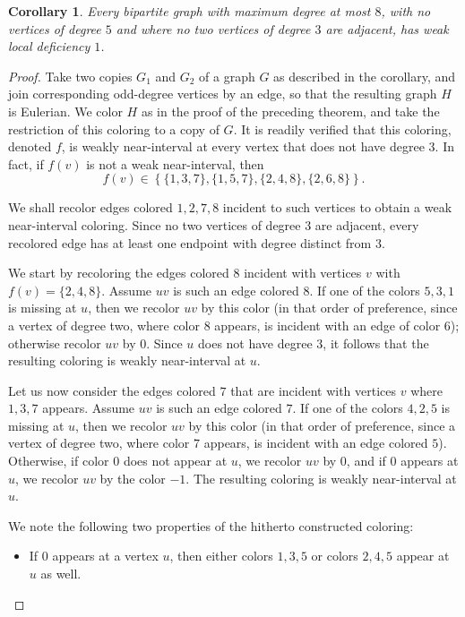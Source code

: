\documentclass[12pt]{article}
\theoremstyle{plain}
\newtheorem{corollary}[theorem]{Corollary}
\theoremstyle{definition}
\numberwithin{equation}{section}
\begin{document}
\begin{corollary}
	Every  bipartite graph with maximum degree at most $8$, with no vertices of degree $5$ and
	where no two vertices of degree $3$ are adjacent, has weak local deficiency $1$.
\end{corollary}
\begin{proof}
	Take two copies $G_1$ and $G_2$ of a graph $G$ as described in the corollary, 
	and join corresponding odd-degree 
	vertices by an edge, so that the resulting graph $H$ is Eulerian. We color $H$
	as in the proof of the preceding
	theorem, and take the restriction of this coloring to a copy of $G$. It is readily verified that this coloring,
	denoted $f$, is weakly near-interval at every vertex that does not have degree $3$.
	In fact, if $f(v)$ is not a weak near-interval, then
	$$f(v) \in \left\{ \{1,3,7\}, \{1,5,7\}, \{2,4,8\}, \{2,6,8\}  \right\}.$$

	We shall recolor edges colored $1,2,7,8$ incident to such vertices to obtain a weak near-interval
	coloring.  Since no two vertices of degree $3$ are adjacent, every recolored
	edge has at least one endpoint with degree distinct from $3$.

	We start by recoloring the edges colored $8$ incident with vertices $v$ with $f(v)=\{2,4,8\}$.
	Assume $uv$ is such an edge colored $8$. If one of the colors $5,3,1$ is missing at $u$,
	then we recolor $uv$ by this color (in that order of preference, since a vertex of degree two,
	where color $8$ appears, is incident with an edge of color $6$); otherwise recolor $uv$ by $0$. 
	Since $u$ does not have degree $3$, it follows that the resulting coloring is weakly near-interval
	at $u$.

	Let us now consider the edges colored $7$ that are incident with vertices $v$ where $1,3,7$ appears.
	Assume $uv$ is such an edge colored $7$. If one of the colors $4,2,5$ is missing at $u$,
	then we recolor $uv$ by this color (in that order of preference, since a vertex of degree two,
	where color $7$ appears, is incident with an edge colored $5$). Otherwise,	
	if color $0$ does not appear at $u$, we recolor $uv$ by $0$, and if $0$ appears at $u$,
	we recolor $uv$ by the color $-1$. The resulting coloring is weakly near-interval at $u$.

	We note the following two properties of the hitherto constructed coloring:
\begin{itemize}
	\item[(a)]	If $0$ appears at a vertex $u$, then either colors $1,3,5$ or colors $2,4,5$ appear at $u$
	as well.


\end{itemize}
\end{proof}
\end{document}
